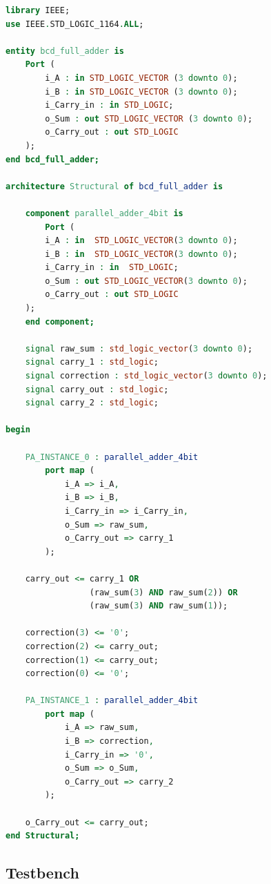 \documentclass[12pt]{article}
\begin{document}
\begin{lstlisting}[language=VHDL]
library IEEE;
use IEEE.STD_LOGIC_1164.ALL;

entity bcd_full_adder is
    Port (
        i_A : in STD_LOGIC_VECTOR (3 downto 0);
        i_B : in STD_LOGIC_VECTOR (3 downto 0);
        i_Carry_in : in STD_LOGIC;
        o_Sum : out STD_LOGIC_VECTOR (3 downto 0);
        o_Carry_out : out STD_LOGIC
    );
end bcd_full_adder;

architecture Structural of bcd_full_adder is

    component parallel_adder_4bit is
        Port (
        i_A : in  STD_LOGIC_VECTOR(3 downto 0);
        i_B : in  STD_LOGIC_VECTOR(3 downto 0);
        i_Carry_in : in  STD_LOGIC;
        o_Sum : out STD_LOGIC_VECTOR(3 downto 0);
        o_Carry_out : out STD_LOGIC
    );
    end component;

    signal raw_sum : std_logic_vector(3 downto 0);
    signal carry_1 : std_logic;
    signal correction : std_logic_vector(3 downto 0);
    signal carry_out : std_logic;
    signal carry_2 : std_logic;

begin

    PA_INSTANCE_0 : parallel_adder_4bit
        port map (
            i_A => i_A,
            i_B => i_B,
            i_Carry_in => i_Carry_in,
            o_Sum => raw_sum,
            o_Carry_out => carry_1
        );

    carry_out <= carry_1 OR
                 (raw_sum(3) AND raw_sum(2)) OR
                 (raw_sum(3) AND raw_sum(1));

    correction(3) <= '0';
    correction(2) <= carry_out;
    correction(1) <= carry_out;
    correction(0) <= '0';

    PA_INSTANCE_1 : parallel_adder_4bit
        port map (
            i_A => raw_sum,
            i_B => correction,
            i_Carry_in => '0',
            o_Sum => o_Sum,
            o_Carry_out => carry_2
        );

    o_Carry_out <= carry_out;
end Structural;
\end{lstlisting}

\subsection*{Testbench}
\end{document}
